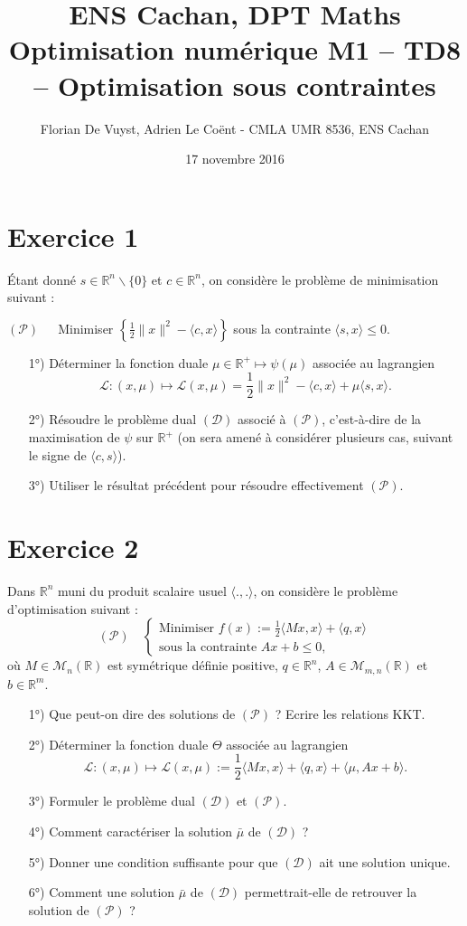 \documentclass[11pt, a4paper]{article}
\title{ENS Cachan, DPT Maths \\ [1cm]
Optimisation numérique M1 -- TD8 -- Optimisation sous contraintes}
\date{17 novembre 2016}
\author{Florian De Vuyst, Adrien Le Coënt - CMLA UMR 8536, ENS Cachan}
\begin{document}
%
\maketitle
%
\section*{Exercice 1}
%
\'Etant donné $s\in \mathbb{R}^n\backslash \{0\}$ et $c\in\mathbb{R}^n$, on considère
le problème de minimisation suivant :
\begin{center}
$(\mathcal{P})\quad$\ Minimiser $\displaystyle{\left\{\frac{1}{2}\|x\|^2-\langle c,x\rangle\right\}}$
sous la contrainte $\langle s,x\rangle\leq 0$.
\end{center}
%
\begin{enumerate}
\item [1°)] Déterminer la fonction duale $\mu\in\mathbb{R}^+\mapsto \psi(\mu)$
associée au lagrangien
\[
\mathcal{L}:(x,\mu) \mapsto \mathcal{L}(x,\mu) = \frac{1}{2}\|x\|^2
-\langle c,x \rangle + \mu \langle s,x\rangle.
\]
%
\item [2°)] Résoudre le problème dual $(\mathcal{D})$ associé à $(\mathcal{P})$,
c'est-à-dire de la maximisation de $\psi$ sur $\mathbb{R}^+$ (on sera amené à 
considérer plusieurs cas, suivant le signe de $\langle c,s \rangle$).
%
\item [3°)] Utiliser le résultat précédent pour résoudre effectivement $(\mathcal{P})$.
%
\end{enumerate}
%
\section*{Exercice 2}
%
Dans $\mathbb{R}^n$ muni du produit scalaire usuel $\langle .,. \rangle$, on considère
le problème d'optimisation suivant :
%
\[
(\mathcal{P})\quad \left\{\begin{array}{l}
\mbox{Minimiser } f(x):= \frac{1}{2} \langle Mx,x \rangle +\langle q,x \rangle\\ [1.1ex]
\mbox{sous la contrainte } Ax+b\leq 0,
\end{array}\right.
\]
où $M\in\mathcal{M}_n(\mathbb{R})$ est symétrique définie positive, $q\in\mathbb{R}^n$,
$A\in \mathcal{M}_{m,n}(\mathbb{R})$ et $b\in\mathbb{R}^m$.
%
\begin{itemize}
\item [1°)] Que peut-on dire des solutions de $(\mathcal{P})$ ? Ecrire les relations KKT.
\item [2°)] Déterminer la fonction duale $\Theta$ associée au lagrangien
\[
\mathcal{L}:(x,\mu)\mapsto \mathcal{L}(x,\mu) :=\frac{1}{2}\langle Mx,x\rangle
+\langle q,x \rangle + \langle \mu,Ax+b\rangle.
\]
%
\item [3°)] Formuler le problème dual $(\mathcal{D})$ et $(\mathcal{P})$.
\item [4°)] Comment caractériser la solution $\bar \mu$ de $(\mathcal{D})$ ?
\item [5°)] Donner une condition suffisante pour que $(\mathcal{D})$ ait une solution
unique.
\item [6°)] Comment une solution $\bar \mu$ de $(\mathcal D)$ permettrait-elle
de retrouver la solution de $(\mathcal{P})$ ?
%
\end{itemize}
%
\end{document}
